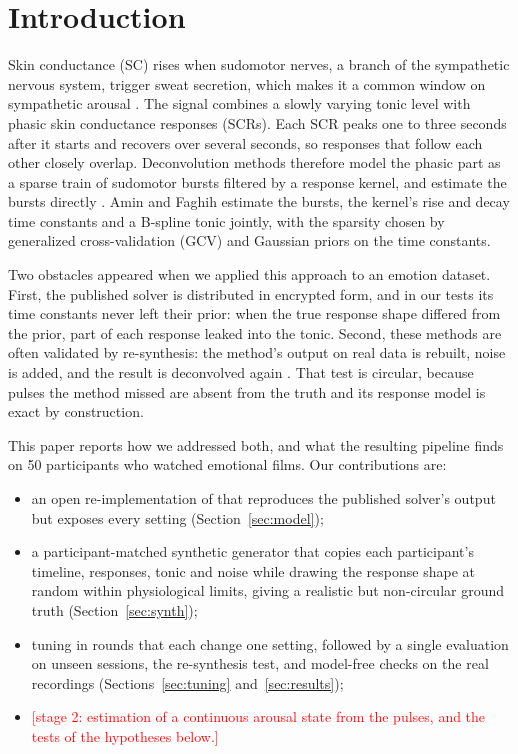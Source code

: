 \documentclass[conference]{IEEEtran}
\newcommand{\todo}[1]{\textcolor{red}{[#1]}}
\begin{document}
\section{Introduction}

Skin conductance (SC) rises when sudomotor nerves, a branch of the sympathetic nervous system,
trigger sweat secretion, which makes it a common window on sympathetic arousal
\cite{boucsein2012}. The signal combines a slowly varying tonic level with phasic skin
conductance responses (SCRs). Each SCR peaks one to three seconds after it starts and recovers
over several seconds, so responses that follow each other closely overlap. Deconvolution methods
therefore model the phasic part as a sparse train of sudomotor bursts filtered by a response
kernel, and estimate the bursts directly
\cite{benedek2010dda,benedek2010cda,greco2016,amin2021}. Amin and Faghih \cite{amin2021} estimate
the bursts, the kernel's rise and decay time constants and a B-spline tonic jointly, with the
sparsity chosen by generalized cross-validation (GCV) and Gaussian priors on the time constants.

Two obstacles appeared when we applied this approach to an emotion dataset. First, the published
solver is distributed in encrypted form, and in our tests its time constants never left their
prior: when the true response shape differed from the prior, part of each response leaked into
the tonic. Second, these methods are often validated by re-synthesis: the method's output on real
data is rebuilt, noise is added, and the result is deconvolved again \cite{amin2021}. That test is
circular, because pulses the method missed are absent from the truth and its response model is
exact by construction.

This paper reports how we addressed both, and what the resulting pipeline finds on 50
participants who watched emotional films. Our contributions are:
\begin{itemize}
\item an open re-implementation of \cite{amin2021} that reproduces the published solver's output
but exposes every setting (Section~\ref{sec:model});
\item a participant-matched synthetic generator that copies each participant's timeline,
responses, tonic and noise while drawing the response shape at random within physiological
limits, giving a realistic but non-circular ground truth (Section~\ref{sec:synth});
\item tuning in rounds that each change one setting, followed by a single evaluation on unseen
sessions, the re-synthesis test, and model-free checks on the real recordings
(Sections~\ref{sec:tuning} and~\ref{sec:results});
\item \todo{stage 2: estimation of a continuous arousal state from the pulses, and the tests of
the hypotheses below.}
\end{itemize}
\end{document}
